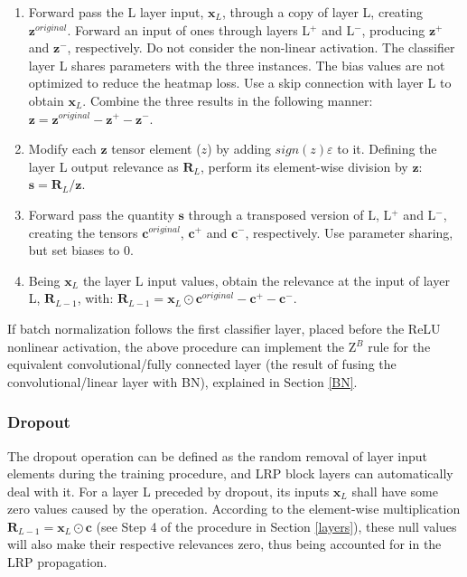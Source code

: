 \documentclass[fleqn,10pt]{wlscirep}
\begin{document}
{\begin{enumerate}
    \item Forward pass the L layer input, $\bm{x}_{L}$, through a copy of layer L, creating $\bm{z}^{original}$. Forward an input of ones through layers L$^{+}$ and L$^{-}$, producing $\bm{z}^{+}$ and $\bm{z}^{-}$, respectively. Do not consider the non-linear activation. The classifier layer L shares parameters with the three instances. The bias values are not optimized to reduce the heatmap loss. Use a skip connection with layer L to obtain $\bm{x}_{L}$. Combine the three results in the following manner: $\bm{z}=\bm{z}^{original}-\bm{z}^{+}-\bm{z}^{-}$.
    \item Modify each $\bm{z}$ tensor element ($z$) by adding $sign(z)\varepsilon$ to it. Defining the layer L output relevance as $\bm{R}_{L}$, perform its element-wise division by $\bm{z}$: $\bm{s}=\bm{R}_{L}/\bm{z}$.
    \item Forward pass the quantity $\bm{s}$ through a transposed version of L, L$^{+}$ and L$^{-}$, creating the tensors $\bm{c}^{original}$, $\bm{c}^{+}$ and $\bm{c}^{-}$, respectively. Use parameter sharing, but set biases to 0.
    \item Being $\bm{x}_{L}$ the layer L input values, obtain the relevance at the input of layer L, $\bm{R}_{L-1}$, with: $\bm{R}_{L-1}=\bm{x}_{L} \odot \bm{c}^{original} -\bm{c}^{+}-\bm{c}^{-}$.
\end{enumerate}

If batch normalization follows the first classifier layer, placed before the ReLU nonlinear activation, the above procedure can implement the Z$^{B}$ rule for the equivalent convolutional/fully connected layer (the result of fusing the convolutional/linear layer with BN), explained in Section \ref{BN}. 

\subsubsection{Dropout}
The dropout operation can be defined as the random removal of layer input elements during the training procedure, and LRP block layers can automatically deal with it. For a layer L preceded by dropout, its inputs $\bm{x}_{L}$ shall have some zero values caused by the operation. According to the element-wise multiplication $\bm{R}_{L-1}=\bm{x}_{L} \odot \bm{c}$ (see Step 4 of the procedure in Section \ref{layers}), these null values will also make their respective relevances zero, thus being accounted for in the LRP propagation. 



}
\end{document}
